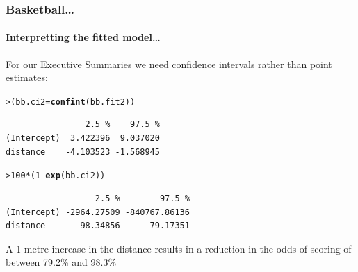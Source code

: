 \documentclass{beamer}\usepackage[]{graphicx}\usepackage[]{xcolor}
\makeatletter
\newcommand{\hlnum}[1]{\textcolor[rgb]{0.686,0.059,0.569}{#1}}%
\newcommand{\hlopt}[1]{\textcolor[rgb]{0,0,0}{#1}}%
\newcommand{\hlstd}[1]{\textcolor[rgb]{0.345,0.345,0.345}{#1}}%
\newcommand{\hlkwb}[1]{\textcolor[rgb]{0.69,0.353,0.396}{#1}}%
\newcommand{\hlkwd}[1]{\textcolor[rgb]{0.737,0.353,0.396}{\textbf{#1}}}%
\newenvironment{kframe}{%
 \def\at@end@of@kframe{}%
 \ifinner\ifhmode%
  \def\at@end@of@kframe{\end{minipage}}%
  \begin{minipage}{\columnwidth}%
 \fi\fi%
 \def\FrameCommand##1{\hskip\@totalleftmargin \hskip-\fboxsep
 \colorbox{shadecolor}{##1}\hskip-\fboxsep
     \hskip-\linewidth \hskip-\@totalleftmargin \hskip\columnwidth}%
 \MakeFramed {\advance\hsize-\width
   \@totalleftmargin\z@ \linewidth\hsize
   \@setminipage}}%
 {\par\unskip\endMakeFramed%
 \at@end@of@kframe}
\newenvironment{knitrout}{}{} %
\makeatother
\begin{document}
\begin{frame}[fragile]
\frametitle{Basketball\ldots}
\framesubtitle{Interpretting the fitted model\ldots}
For our Executive Summaries we need confidence intervals rather than point estimates:
\medskip

\begin{knitrout}\scriptsize
{}\color{fgcolor}\begin{kframe}
\begin{alltt}
\hlstd{> }\hlstd{(bb.ci2} \hlkwb{=} \hlkwd{confint}\hlstd{(bb.fit2))}
\end{alltt}


{\ttfamily\noindent\itshape\color{messagecolor}{Waiting for profiling to be done...}}\begin{verbatim}
                2.5 %    97.5 %
(Intercept)  3.422396  9.037020
distance    -4.103523 -1.568945
\end{verbatim}
\begin{alltt}
\hlstd{> }\hlnum{100}\hlopt{*}\hlstd{(}\hlnum{1}\hlopt{-}\hlkwd{exp}\hlstd{(bb.ci2))}
\end{alltt}
\begin{verbatim}
                  2.5 %        97.5 %
(Intercept) -2964.27509 -840767.86136
distance       98.34856      79.17351
\end{verbatim}
\end{kframe}
\end{knitrout}

A 1 metre increase in the distance results in a reduction in the odds of scoring of between 79.2\% and 98.3\%

\end{frame}
\end{document}

